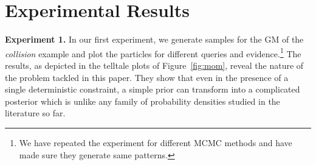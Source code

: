 \documentclass{article}
\begin{document}

\section{Experimental Results}
\textbf{Experiment 1.} In our first experiment, we generate samples for the GM of the \emph{collision} example and 
plot the particles for different queries and evidence.\footnote{We have repeated the experiment for different 
MCMC methods and have made sure they generate same patterns.}
The results, as depicted in the telltale plots of Figure~\ref{fig:mom}, reveal the nature of the problem tackled in this paper.
They show that even in the presence of a single deterministic constraint, 
a simple prior can transform into a complicated posterior which is unlike any family of 
probability densities studied in the literature so far.
\end{document}
